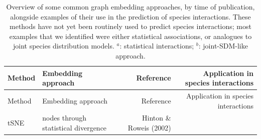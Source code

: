 \documentclass[10pt,oneside]{article}
\begin{document}
\hypertarget{tbl:methods}{}
\begin{longtable}[]{@{}llrr@{}}
\caption{\label{tbl:methods}Overview of some common graph embedding
approaches, by time of publication, alongside examples of their use in
the prediction of species interactions. These methods have not yet been
routinely used to predict species interactions; most examples that we
identified were either statistical associations, or analogues to joint
species distribution models. \(^a\): statistical interactions; \(^b\):
joint-SDM-like approach.}\tabularnewline
\toprule
\begin{minipage}[b]{0.11\columnwidth}\raggedright
Method\strut
\end{minipage} & \begin{minipage}[b]{0.30\columnwidth}\raggedright
Embedding approach\strut
\end{minipage} & \begin{minipage}[b]{0.16\columnwidth}\raggedleft
Reference\strut
\end{minipage} & \begin{minipage}[b]{0.32\columnwidth}\raggedleft
Application in species interactions\strut
\end{minipage}\tabularnewline
\midrule
\endfirsthead
\toprule
\begin{minipage}[b]{0.11\columnwidth}\raggedright
Method\strut
\end{minipage} & \begin{minipage}[b]{0.30\columnwidth}\raggedright
Embedding approach\strut
\end{minipage} & \begin{minipage}[b]{0.16\columnwidth}\raggedleft
Reference\strut
\end{minipage} & \begin{minipage}[b]{0.32\columnwidth}\raggedleft
Application in species interactions\strut
\end{minipage}\tabularnewline
\midrule
\endhead
\begin{minipage}[t]{0.11\columnwidth}\raggedright
tSNE\strut
\end{minipage} & \begin{minipage}[t]{0.30\columnwidth}\raggedright
nodes through statistical divergence\strut
\end{minipage} & \begin{minipage}[t]{0.16\columnwidth}\raggedleft
Hinton \& Roweis (2002)\strut
\end{minipage} & \begin{minipage}[t]{0.32\columnwidth}\raggedleft

\end{minipage}
\end{longtable}
\end{document}
